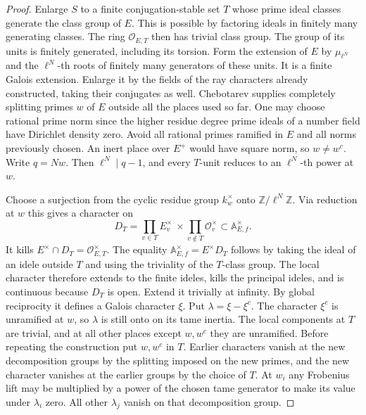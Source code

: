 \documentclass[a4paper,11pt]{article}
\theoremstyle{definition}
\theoremstyle{remark}
\newcommand{\ZZ}{\mathbb Z}\newcommand{\ord}{\operatorname{ord}}
\numberwithin{equation}{section}
\begin{document}
\begin{proof}
Enlarge \(S\) to a finite conjugation-stable set \(T\) whose prime ideal
classes generate the class group of \(E\). This is possible by factoring
ideals in finitely many generating classes. The ring \(\mathcal O_{E,T}\)
then has trivial class group. The group of its units is finitely generated,
including its torsion. Form the extension of \(E\) by \(\mu_{\ell^N}\)
and the \(\ell^N\)-th roots of finitely many generators of these units.
It is a finite Galois extension. Enlarge it by the fields of the ray
characters already constructed, taking their conjugates as well.
Chebotarev supplies completely splitting primes \(w\) of \(E\) outside
all the places used so far. One may choose rational prime norm since
the higher residue degree prime ideals of a number field have Dirichlet
density zero. Avoid all rational primes ramified in \(E\) and all norms
previously chosen. An inert place over \(E^+\) would have square norm,
so \(w\ne w^c\). Write \(q=Nw\). Then \(\ell^N\mid q-1\), and every
\(T\)-unit reduces to an \(\ell^N\)-th power at \(w\).
~\cite{II-II-II-chebotarev713}

Choose a surjection from the cyclic residue group \(k_w^\times\) onto
\(\ZZ/\ell^N\ZZ\). Via reduction at \(w\) this gives a character on
\[
        D_T=\prod_{v\in T} E_v^\times
                    \ \times\!\prod_{v\notin T}\mathcal O_v^\times
                         \subset\mathbb A_{E,f}^\times .
\]
It kills \(E^\times\cap D_T=\mathcal O_{E,T}^\times\). The equality
\(\mathbb A_{E,f}^\times=E^\times D_T\) follows by taking the ideal of
an idele outside \(T\) and using the triviality of the \(T\)-class group.
The local character therefore extends to the finite ideles, kills the
principal ideles, and is continuous because \(D_T\) is open. Extend it
trivially at infinity. By global reciprocity it defines a Galois
character \(\xi\). Put \(\lambda=\xi-\xi^c\). The character \(\xi^c\)
is unramified at \(w\), so \(\lambda\) is still onto on its tame
inertia. The local components at \(T\) are trivial, and at all other
places except \(w,w^c\) they are unramified. Before repeating the
construction put \(w,w^c\) in \(T\). Earlier characters vanish at the
new decomposition groups by the splitting imposed on the new primes,
and the new character vanishes at the earlier groups by the choice of
\(T\). At \(w_i\) any Frobenius lift may be multiplied by a power of
the chosen tame generator to make its value under \(\lambda_i\) zero.
All other \(\lambda_j\) vanish on that decomposition group.
\end{proof}
\end{document}
